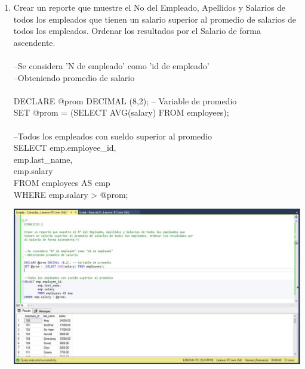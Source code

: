 \begin{enumerate}[1.]
	\item Crear un reporte que muestre el No del Empleado, Apellidos y Salarios de todos los empleados que tienen un salario superior al promedio de salarios de todos los empleados. Ordenar los resultados por el Salario de forma ascendente.
	\\
	\\--Se considera 'N de empleado' como 'id de empleado'
	\\--Obteniendo promedio de salario
	\\
	\\DECLARE @prom DECIMAL (8,2); -- Variable de promedio
	\\SET @prom = (SELECT AVG(salary) FROM employees);
	\\
	\\--Todos los empleados con sueldo superior al promedio
	\\SELECT emp.employee\_id,
	\\		emp.last\_name,
	\\		emp.salary
	\\		FROM employees AS emp
	\\WHERE emp.salary > @prom;\\

	\begin{center}
	\includegraphics[width=17cm]{./Imagenes/Actividad9-Ejercicio02} 
	\end{center}


\end{enumerate}
